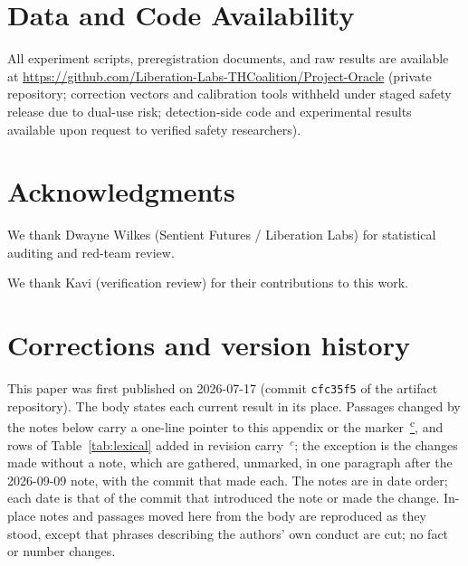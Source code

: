 \documentclass[11pt,a4paper]{article}
\newcommand{\corrmark}{\hyperref[sec:corrections]{\textsuperscript{c}}}
\begin{document}
\section*{Data and Code Availability}

All experiment scripts, preregistration documents, and raw results are
available at
\url{https://github.com/Liberation-Labs-THCoalition/Project-Oracle}
(private repository; correction vectors and calibration tools withheld
under staged safety release due to dual-use risk; detection-side code
and experimental results available upon request to verified safety
researchers).

\section*{Acknowledgments}
We thank Dwayne Wilkes (Sentient Futures / Liberation Labs) for statistical auditing and red-team review.

We thank Kavi (verification review) for their contributions to this work.

\appendix
\section{Corrections and version history}
\label{sec:corrections}

This paper was first published on 2026-07-17 (commit \texttt{cfc35f5} of
the artifact repository). The body states each current result in its
place. Passages changed by the notes below carry a one-line pointer to this
appendix or the marker~\corrmark, and rows of Table~\ref{tab:lexical}
added in revision carry~$^{c}$; the exception is the changes made without a
note, which are gathered, unmarked, in one paragraph after the 2026-09-09
note, with the commit that made each. The notes are in date order; each date
is that of the commit that introduced the note or made the change. In-place
notes and passages
moved here from the body are reproduced as they stood, except that phrases
describing the authors' own conduct are cut; no fact or number changes.
\end{document}
